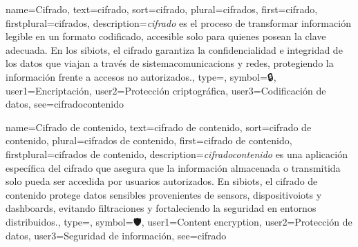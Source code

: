 	
	{
		name={Cifrado},
		text={cifrado},
		sort={cifrado},
		plural={cifrados},
		first={cifrado},
		firstplural={cifrados},
		description={\emph{\gls{cifrado}} es el proceso de transformar informaci{\'o}n legible en un formato codificado, accesible solo para quienes posean la clave adecuada. En los \glspl{sibiot}, el cifrado garantiza la confidencialidad e integridad de los datos que viajan a trav{\'e}s de \glspl{sistemacomunicacion} y redes, protegiendo la informaci{\'o}n frente a accesos no autorizados.},
		type=\glsdefaulttype,
		symbol={🔒},
		user1={Encriptaci{\'o}n},
		user2={Protecci{\'o}n criptogr{\'a}fica},
		user3={Codificaci{\'o}n de datos},
		see={cifradocontenido}
	}
	
	{
		name={Cifrado de contenido},
		text={cifrado de contenido},
		sort={cifrado de contenido},
		plural={cifrados de contenido},
		first={cifrado de contenido},
		firstplural={cifrados de contenido},
		description={\emph{\gls{cifradocontenido}} es una aplicaci{\'o}n espec{\'i}fica del \gls{cifrado} que asegura que la informaci{\'o}n almacenada o transmitida solo pueda ser accedida por usuarios autorizados. En \glspl{sibiot}, el cifrado de contenido protege datos sensibles provenientes de \glspl{sensor}, \glspl{dispositivoiot} y \glspl{dashboard}, evitando filtraciones y fortaleciendo la \gls{seguridad} en entornos distribuidos.},
		type=\glsdefaulttype,
		symbol={🛡️},
		user1={Content encryption},
		user2={Protecci{\'o}n de datos},
		user3={Seguridad de informaci{\'o}n},
		see={cifrado}
	}
	
